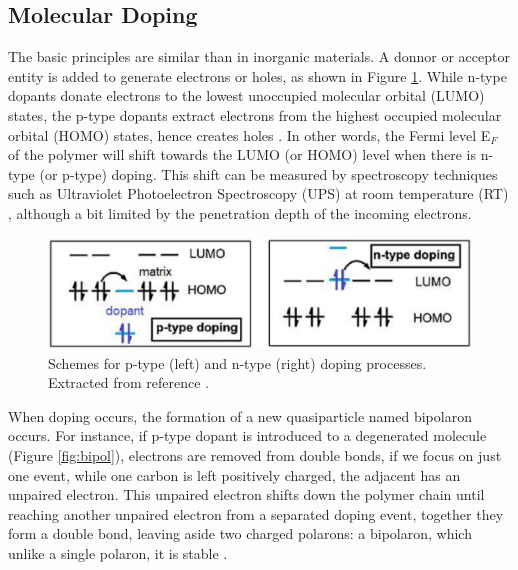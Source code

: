 \subsection{Molecular Doping} \label{subsec:moldop}
The basic principles are similar than in inorganic materials. A donnor or acceptor entity is added to generate electrons or holes, as shown in Figure \ref{fig:dopscheme}. While n-type dopants donate electrons to the lowest unoccupied molecular orbital (LUMO) states, the p-type dopants extract electrons from the highest occupied molecular orbital (HOMO) states, hence creates holes \cite{lussemDopingOrganicSemiconductors2013}. In other words, the Fermi level E$_{F}$ of the polymer will shift towards the LUMO (or HOMO) level when there is n-type (or p-type) doping. This shift can be measured by spectroscopy techniques such as Ultraviolet Photoelectron Spectroscopy (UPS) at room temperature (RT) \cite{tietzeFermiLevelShift2012}, although a bit limited by the penetration depth of the incoming electrons.

\begin{figure}[h]
  \centering
  \includegraphics[width=12cm]{Images/pdf/doping.pdf}
  \caption[Scheme of doping processes in organic semiconductors]{Schemes for p-type (left) and n-type (right) doping processes. Extracted from reference \cite{lussemDopingOrganicSemiconductors2013}.}
  \label{fig:dopscheme}
\end{figure}

When doping occurs, %
the formation of a new quasiparticle named bipolaron occurs. For instance, if p-type dopant is introduced to a degenerated molecule (Figure \ref{fig:bipol}), electrons are removed from double bonds, if we focus on just one event, while one carbon is left positively charged, the adjacent has an unpaired electron. This unpaired electron shifts down the polymer chain until reaching another unpaired electron from a separated doping event, together they form a double bond, leaving aside two charged polarons: a bipolaron, which unlike a single polaron, it is stable \cite{bredasPolaronsBipolaronsSolitons1985}. %


